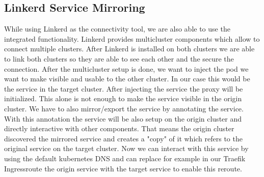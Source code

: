 \subsection{Linkerd Service Mirroring}
%
While using Linkerd as the connectivity tool, we are also able to use the integrated functionality.
Linkerd provides multicluster components which allow to connect multiple clusters.
After Linkerd is installed on both clusters we are able to link both clusters so they are able to see each other and the secure the connection.
After the multicluster setup is done, we want to inject the pod we want to make visible and usable to the other cluster.
In our case this would be the service in the target cluster.
After injecting the service the proxy will be initialized.
This alone is not enough to make the service visible in the origin cluster.
We have to also mirror/export the service by annotating the service.
With this annotation the service will be also setup on the origin cluster and directly interactive with other components.
That means the origin cluster discovered the mirrored service and creates a "copy" of it which refers to the original service on the target cluster.
Now we can interact with this service by using the default kubernetes DNS and can replace for example in our Traefik Ingressroute the origin service with the target service to enable this reroute.
